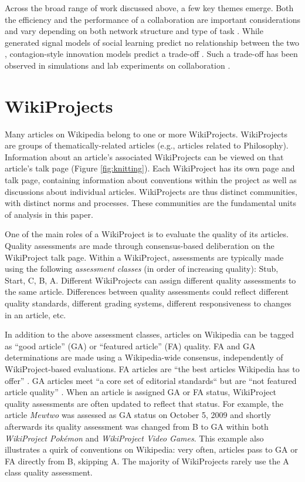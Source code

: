 Across the broad range of work discussed above,
a few key themes emerge.
Both the efficiency and the performance of a collaboration are important
considerations and vary depending on both network structure and type of task
\cite{kearns_experiments_2012}.
While generated signal models of social learning predict no relationship
between the two
\cite{golub_naive_2010},
contagion-style innovation models predict a trade-off
\cite{mason_collaborative_2012,barkoczi_social_2016}.
Such a trade-off has been observed in simulations and lab experiments on
collaboration
\cite{kearns_experiments_2012,grim_scientific_2013}.

\section{WikiProjects}
\label{sec:wp}

Many articles on Wikipedia belong to one or more WikiProjects.
WikiProjects are groups of thematically-related articles
(e.g., articles related to Philosophy).
Information about an article's associated WikiProjects
can be viewed on that
article's talk page (Figure \ref{fig:knitting}).
Each WikiProject has its own page and talk page,
containing information about conventions within the project
as well as discussions about individual articles.
WikiProjects are thus distinct communities, with distinct norms and processes.
These communities are the fundamental units of analysis in this paper.

One of the main roles of a WikiProject is to evaluate the quality of its articles.
Quality assessments are made through consensus-based deliberation on the WikiProject
talk page.
Within a WikiProject,
assessments are typically made using the following {\em assessment classes}
(in order of increasing quality):
Stub, Start, C, B, A.
Different WikiProjects can assign different quality assessments to the same
article.
Differences between quality assessments could reflect different quality standards,
different grading systems, different responsiveness to changes in an article, etc.

In addition to the above assessment classes, articles on Wikipedia can be tagged as
``good article'' (GA) or ``featured article'' (FA) quality.
FA and GA determinations are made using a Wikipedia-wide consensus,
independently of WikiProject-based evaluations.
FA articles are ``the best articles Wikipedia has to offer''
\cite{wikipedia_contributors_wikipedia:featured_2018}.
GA articles meet ``a core set of editorial standards`` but are ``not featured article quality''
\cite{wikipedia_contributors_wikipedia:good_2017}.
When an article is assigned GA or FA status,
WikiProject quality assessments are often updated to reflect that status.
For example, the article {\em Mewtwo} was assessed as GA status on October 5,
2009 and shortly afterwards
its quality assessment was changed from B to GA within both
{\em WikiProject Pok\'emon} and
{\em WikiProject Video Games}.
This example also illustrates a quirk of conventions on Wikipedia:
very often, articles pass to GA or FA directly from B, skipping A.
The majority of WikiProjects rarely use the A class quality assessment.

